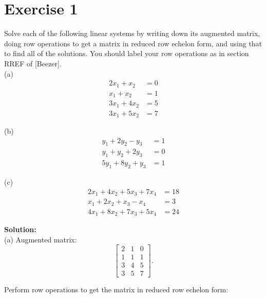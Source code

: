\documentclass{article}
\begin{document}
\section*{Exercise 1}
Solve each of the following linear systems by writing down its augmented matrix, doing row operations to get a matrix in reduced row echelon form, and using that to find all of the solutions. You should label your row operations as in section RREF of [Beezer]. \\

(a) 
\begin{align*}
2x_1 + x_2 &= 0 \\
x_1 + x_2 &= 1 \\
3x_1 + 4x_2 &= 5 \\
3x_1 + 5x_2 &= 7
\end{align*}

(b)
\begin{align*}
y_1 + 2y_2 - y_3 &= 1 \\
y_1 + y_2 + 2y_3 &= 0 \\
5y_1 + 8y_2 + y_3 &= 1
\end{align*}

(c)
\begin{align*}
2x_1 + 4x_2 + 5x_3 + 7x_4 &= 18 \\
x_1 + 2x_2 + x_3 - x_4 &= 3 \\
4x_1 + 8x_2 + 7x_3 + 5x_4 &= 24
\end{align*}

\textbf{Solution:} \\

(a) Augmented matrix:
\[
\left[
\begin{array}{cc|c}
2 & 1 & 0 \\
1 & 1 & 1 \\
3 & 4 & 5 \\
3 & 5 & 7
\end{array}
\right].
\]

Perform row operations to get the matrix in reduced row echelon form:
\end{document}
